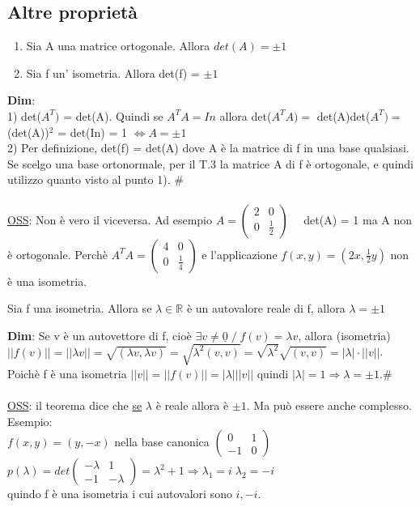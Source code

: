 \documentclass[12pt]{article}
\begin{document}
\subsection{Altre proprietà}
\begin{theorem}
    \begin{enumerate}
        \item Sia A una matrice ortogonale. Allora $det(A) = \pm 1$
        \item Sia f un' isometria. Allora det(f) = $\pm 1$
    \end{enumerate}
\end{theorem}

\noindent\textbf{Dim}:\\
1) det($A^T)$ = det(A). Quindi se $A^TA = In$ allora det($A^TA) = $ det(A)det($A^T) = $ (det(A))$^2$
= det(In) = 1 $\iff A = \pm1 $\\
2) Per definizione, det(f) = det(A) dove A è la matrice di f in una base qualsiasi. Se scelgo una base ortonormale, per il T.3 la matrice A di f è ortogonale, e quindi utilizzo quanto visto al punto 1). $\#$\\\\
\underline{OSS}: Non è vero il viceversa. Ad esempio $A = \begin{pmatrix}
    2 & 0\\
    0 & \frac{1}{2}
\end{pmatrix}\quad$ det(A) = 1 ma A non è ortogonale.
Perchè $A^TA = \begin{pmatrix}
    4 & 0 \\
    0 & \frac{1}{4}
\end{pmatrix}$ e l'applicazione $f(x,y) = (2x, \frac{1}{2}y)$ non è una isometria.
\begin{theorem}
    Sia f una isometria. Allora se $\lambda \in \mathbb{R}$ è un autovalore reale di f, allora $\lambda = \pm 1$
\end{theorem}
\textbf{Dim}: Se v è un autovettore di f, cioè $\exists v \neq \underline{0} \;/\; f(v) = \lambda v$, allora (isometria) $||f(v)|| = ||\lambda v|| = \sqrt{(\lambda v, \lambda v)} = \sqrt{\lambda ^ 2(v,v)} = \sqrt{\lambda^2}\sqrt{(v,v)} = |\lambda|\cdot||v||$.\\
Poichè f è una isometria $||v|| = ||f(v)|| = |\lambda|||v||$ quindi $|\lambda| = 1 \Rightarrow \lambda = \pm 1. \#$\\\\
\underline{OSS}: il teorema dice che \underline{se} $\lambda$ è reale allora è $\pm 1$. Ma può essere anche complesso.\\
Esempio:\\
$f(x,y) = (y, -x)$ nella base canonica $\begin{pmatrix}
    0 & 1\\
    -1 & 0
\end{pmatrix}$\\
$p(\lambda) = det\begin{pmatrix}
    -\lambda & 1\\
    -1 & -\lambda
\end{pmatrix} = \lambda ^ 2+1 \Rightarrow \lambda_1 = i\; \lambda_2 = -i$\\
quindo f è una isometria i cui autovalori sono $i,-i$.
\end{document}
